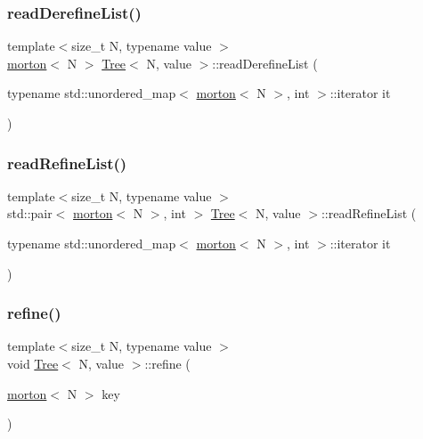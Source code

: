 \mbox{\label{classTree_acc8f2387fd43e2d148c7a800eddd0c31}} 
\subsubsection{\texorpdfstring{read\+Derefine\+List()}{readDerefineList()}}
{\footnotesize\ttfamily template$<$size\+\_\+t N, typename value $>$ \\
\mbox{\hyperlink{definitions_8h_af8682350bd8bb38ee9023f7a0a310add}{morton}}$<$ N $>$ \mbox{\hyperlink{classTree}{Tree}}$<$ N, value $>$\+::read\+Derefine\+List (\begin{DoxyParamCaption}\item[{typename std\+::unordered\+\_\+map$<$ \mbox{\hyperlink{definitions_8h_af8682350bd8bb38ee9023f7a0a310add}{morton}}$<$ N $>$, int $>$\+::iterator}]{it }\end{DoxyParamCaption})}

\mbox{\label{classTree_ae4cedc682194265e242bc37bc3df1386}} 
\subsubsection{\texorpdfstring{read\+Refine\+List()}{readRefineList()}}
{\footnotesize\ttfamily template$<$size\+\_\+t N, typename value $>$ \\
std\+::pair$<$ \mbox{\hyperlink{definitions_8h_af8682350bd8bb38ee9023f7a0a310add}{morton}}$<$ N $>$, int $>$ \mbox{\hyperlink{classTree}{Tree}}$<$ N, value $>$\+::read\+Refine\+List (\begin{DoxyParamCaption}\item[{typename std\+::unordered\+\_\+map$<$ \mbox{\hyperlink{definitions_8h_af8682350bd8bb38ee9023f7a0a310add}{morton}}$<$ N $>$, int $>$\+::iterator}]{it }\end{DoxyParamCaption})}

\mbox{\label{classTree_af2b416c08ae9132bfd466fe3fa288033}} 
\subsubsection{\texorpdfstring{refine()}{refine()}}
{\footnotesize\ttfamily template$<$size\+\_\+t N, typename value $>$ \\
void \mbox{\hyperlink{classTree}{Tree}}$<$ N, value $>$\+::refine (\begin{DoxyParamCaption}\item[{\mbox{\hyperlink{definitions_8h_af8682350bd8bb38ee9023f7a0a310add}{morton}}$<$ N $>$}]{key }\end{DoxyParamCaption})}

